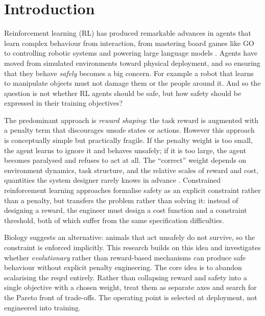 \documentclass[a4paper,twoside,12pt]{report}
\begin{document}
\chapter{Introduction}

Reinforcement learning (RL) has produced remarkable advances in agents that learn complex behaviour from interaction, from mastering board games like GO\citep{silver2017alphazero} to controlling robotic systems \citep{kalashnikov2018qtopt} and powering large language models \citep{ouyang2022instructgpt}. Agents have moved from simulated environments toward physical deployment, and so ensuring that they behave \emph{safely} becomes a big concern. For example a robot that learns to manipulate objects must not damage them or the people around it. And so the question is not whether RL agents should be safe, but how safety should be expressed in their training objectives?

The predominant approach is \emph{reward shaping}: the task reward is augmented with a penalty term that discourages unsafe states or actions. However this approach is conceptually simple but practically fragile. If the penalty weight is too small, the agent learns to ignore it and behaves unsafely; if it is too large, the agent becomes paralysed and refuses to act at all. The ``correct'' weight depends on environment dynamics, task structure, and the relative scales of reward and cost, quantities the system designer rarely knows in advance \citep{skalse2022rewardhacking,fu2025rewardshaping}. Constrained reinforcement learning approaches \citep{achiam2017cpo,ray2019safetygym} formalise safety as an explicit constraint rather than a penalty, but transfers the problem rather than solving it: instead of designing a reward, the engineer must design a cost function and a constraint threshold, both of which suffer from the same specification difficulties.

Biology suggests an alternative: animals that act unsafely do not survive, so the constraint is enforced implicitly. This research builds on this idea and investigates whether \emph{evolutionary} rather than reward-based mechanisms can produce safe behaviour without explicit penalty engineering. The core idea is to abandon scalarising the reqrd entirely. Rather than collapsing reward and safety into a single objective with a chosen weight, treat them as separate axes and search for the Pareto front of trade-offs. The operating point is selected at deployment, not engineered into training.
\end{document}
